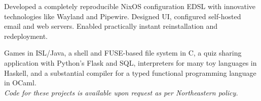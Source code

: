 \documentclass[letterpaper]{cv} %
\begin{document}
\begin{minipage}[t]{0.66\textwidth}
  Developed a completely reproducible NixOS configuration EDSL with innovative technologies like Wayland and Pipewire. Designed UI, configured self-hosted email and web servers. Enabled practically instant reinstallation and redeployment.\@
  \sectionspace

  Games in ISL/Java,
  a shell and FUSE-based file system in C,
  a quiz sharing application with Python's Flask and SQL,
  interpreters for many toy languages in Haskell,
  and a substantial compiler for a typed functional programming language in OCaml. \\
  \textit{Code for these projects is available upon request as per Northeastern policy.}

\end{minipage} %
\end{document}

